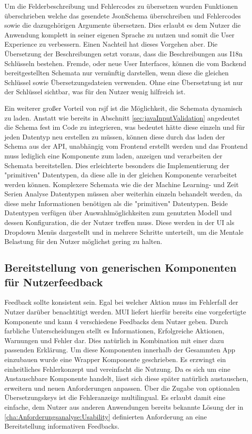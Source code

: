  
Um die Felderbeschreibung und Fehlercodes zu übersetzen wurden Funktionen überschrieben welche das gesendete JsonSchema überschreiben und Fehlercodes sowie die dazugehörigen Argumente übersetzen. 
Dies erlaubt es dem Nutzer die Anwendung komplett in seiner eigenen Sprache zu nutzen und somit die User Experience zu verbessern.
Einen Nachteil hat dieses Vorgehen aber. Die Übersetzung der Beschreibungen setzt voraus, dass die Beschreibungen aus I18n Schlüsseln bestehen.
Fremde, oder neue User Interfaces, können die vom Backend bereitgestellten Schemata nur vernünftig darstellen, wenn diese die gleichen Schlüssel sowie Übersetzungsdateien verwenden.
Ohne eine Übersetztung ist nur der Schlüssel sichtbar, was für den Nutzer wenig hilfreich ist.

Ein weiterer großer Vorteil von rsjf ist die Möglichkeit, die Schemata dynamisch zu laden.
Anstatt wie bereits in Abschnitt \ref{sec:javaInputValidation} angedeutet die Schema fest im Code zu integrieren, was bedeutet hätte diese einzeln und für jeden Datentyp neu erstellen zu müssen, können diese durch das laden der Schema aus der API,
unabhängig vom Frontend erstellt werden und das Frontend muss lediglich eine Komponente zum laden, anzeigen und verarbeiten der Schemata bereitstellen.
Dies erleichterte besonders die Implementierung der "primitiven" Datentypen, da diese alle in der gleichen Komponente verarbeitet werden können.
Komplexere Schemata wie die der Machine Learning- und Zeit Serien Analyse Datentypen müssen aber weiterhin einzeln behandelt werden, da diese mehr Informationen benötigen als die "primitiven" Datentypen. 
Beide Datentypen verfügen über Auswahlmöglichkeiten zum genutzten Modell und dessen Konfiguration, die der Nutzer treffen muss. Diese werden in der UI als Dropdown Menüs dargestellt und in mehrere Schritte unterteilt, um die Mentale Belastung für den Nutzer möglichst gering zu halten.


\subsection{Bereitstellung von generischen Komponenten für Nutzerfeedback}
Feedback sollte konsistent sein. Egal bei welcher Aktion muss im Fehlerfall der Nutzer darüber benachtitigt werden.
MUI liefert hierfür bereits eine vorgefertigte Komponente und kann 4 verschiedene Feedbacks dem Nutzer geben.
Durch farbliche Unterscheidungen stellt es Informationen, Erfolgreiche Aktionen, Warnungen und Fehler dar. Dies natürlich in Kombination mit einer dazu passenden Erklärung.
Um diese Komponenten innerhalb der Gesammten App einzubauen wurde eine Wrapper Komponente geschrieben. 
Es erzwingt ein einheitliches Fehlerkonzept und vereinfacht die Nutzung. Da es sich um eine Austauschbare Komponente handelt, lässt sich diese später natürlich austauschen, erweitern und neuen Anforderungen anpassen.
Über die Zugabe von optionalen Übersetzungskeys ist die Fehleranzeige multilingual.
Es erlaubt damit eine einfache, dem Nutzer aus anderen Anwendungen bereits bekannte Lösung der in \ref{cha:Anforderungsanalyse:Usability} definierten Anforderung an eine Bereitstellung informativen Feedbacks.

